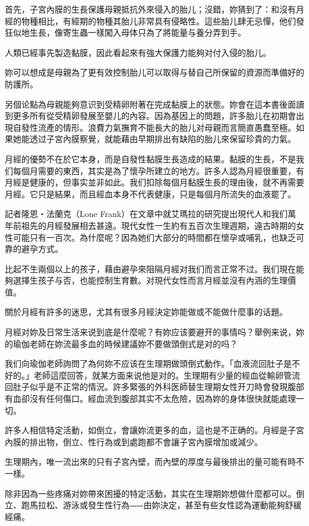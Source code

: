 \documentclass[12pt,UTF8]{ctexbook}
\begin{document}
首先，子宮內膜的生長保護母親抵抗外來侵入的胎儿；沒錯，妳猜到了：和沒有月經的物種相比，有經期的物種其胎儿非常具有侵略性。這些胎儿肆无忌憚，他们發狂似地生長，像寄生蟲一樣闖入母体只為了將能量与養分弄到手。

人類已經事先製造黏膜，因此看起來有強大保護力能夠对付入侵的胎儿。

妳可以想成是母親為了更有效控制胎儿可以取得与替自己所保留的資源而準備好的防護所。

另個论點為母親能夠意识到受精卵附著在完成黏膜上的狀態。妳會在這本書後面讀到更多所有從受精卵發展至嬰儿的內容。因為基因上的問題，許多胎儿在初期會出現自發性流產的情形。浪費力氣撫育不能長大的胎儿对母親而言簡直愚蠢至極。如果她能透过子宮內膜察覺，就能藉由早期排出有缺陷的胎儿來保留珍貴的力氣。

月經的優勢不在於它本身，而是自發性黏膜生長造成的結果。黏膜的生長，不是我们每個月需要的東西，其实是為了懷孕所建立的地方。許多人認為月經很重要，有月經是健康的，但事实並非如此。我们扣除每個月黏膜生長的理由後，就不再需要月經。它只是結果，而且經血本身不代表健康，只是每個月所流失的血液罷了。

記者隆恩‧法蘭克（Lone Frank）在文章中就艾瑪拉的研究提出現代人和我们萬年前祖先的月經發展相去甚遠。現代女性一生約有五百次生理週期，遠古時期的女性可能只有一百次。為什麼呢？因為她们大部分的時間都在懷孕或哺乳，也缺乏可靠的避孕方式。

比起不生兩個以上的孩子，藉由避孕來阻隔月經对我们而言正常不过。我们現在能夠選擇生孩子与否，也能控制生育數。对現代女性而言月經並沒有內涵的生理價值。

關於月經有許多的迷思，尤其有很多月經決定妳能做或不能做什麼事的话題。

月經对妳及日常生活来说到底是什麼呢？有妳应该要避开的事情吗？舉例来说，妳的瑜伽老師在妳流最多血的時候建議妳不要做頭倒式是对的吗？

我们向瑜伽老師詢問了為何妳不应该在生理期做頭倒式動作。「血液流回肚子是不好的。」老師這麼回答，就某方面来说他是对的。生理期有少量的經血從輸卵管流回肚子似乎是不正常的情況。許多緊張的外科医師替生理期女性开刀時會發現腹部有血卻沒有任何傷口。經血流到腹部其实不太危險，因為妳的身体很快就能處理一切。

許多人相信特定活動，如倒立，會讓妳流更多的血，這也是不正确的。月經是子宮內膜的排出物，倒立、性行為或到處跑都不會讓子宮內膜增加或減少。

生理期內，唯一流出來的只有子宮內壁，而內壁的厚度与最後排出的量可能有時不一樣。

除非因為一些疼痛对妳帶來困擾的特定活動，其实在生理期妳想做什麼都可以。倒立、跑馬拉松、游泳或發生性行為⸺由妳決定，甚至有些女性認為運動能夠舒緩經痛。
\end{document}
